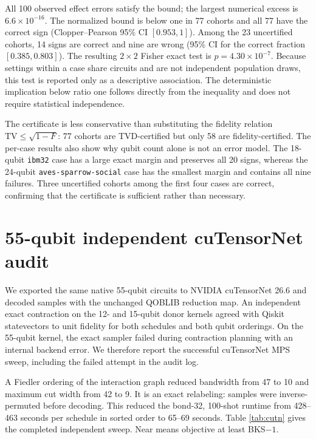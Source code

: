 \documentclass[10pt]{article}
\begin{document}
All 100 observed effect errors satisfy the bound; the largest numerical excess
is $6.6\times10^{-16}$. The normalized bound is below one in 77 cohorts and all
77 have the correct sign (Clopper--Pearson 95\% CI $[0.953,1]$). Among the 23
uncertified cohorts, 14 signs are correct and nine are wrong (95\% CI for the
correct fraction $[0.385,0.803]$). The resulting $2\times2$ Fisher exact test is
$p=4.30\times10^{-7}$. Because settings within a case share circuits and are
not independent population draws, this test is reported only as a descriptive
association. The deterministic implication below ratio one follows directly
from the inequality and does not require statistical independence.

The certificate is less conservative than substituting the fidelity relation
$\mathrm{TV}\leq\sqrt{1-F}$: 77 cohorts are TVD-certified but only 58 are
fidelity-certified. The per-case results also show why qubit count alone is not
an error model. The 18-qubit \texttt{ibm32} case has a large exact margin and
preserves all 20 signs, whereas the 24-qubit \texttt{aves-sparrow-social} case
has the smallest margin and contains all nine failures. Three uncertified
cohorts among the first four cases are correct, confirming that the certificate
is sufficient rather than necessary.

\FloatBarrier
\section{55-qubit independent cuTensorNet audit}

We exported the same native 55-qubit circuits to NVIDIA cuTensorNet 26.6 and
decoded samples with the unchanged QOBLIB reduction map.  An independent
exact contraction on the 12- and 15-qubit donor kernels agreed with Qiskit
statevectors to unit fidelity for both schedules and both qubit orderings.
On the 55-qubit kernel, the exact sampler failed during contraction planning
with an internal backend error.  We therefore report the successful
cuTensorNet MPS sweep, including the failed attempt in the audit log.

A Fiedler ordering of the interaction graph reduced bandwidth from 47 to 10
and maximum cut width from 42 to 9.  It is an exact relabeling: samples were
inverse-permuted before decoding.  This reduced the bond-32, 100-shot runtime
from 428--463 seconds per schedule in sorted order to 65--69 seconds.  Table
\ref{tab:cutn} gives the completed independent sweep.  Near means objective
at least BKS$-1$.
\end{document}
